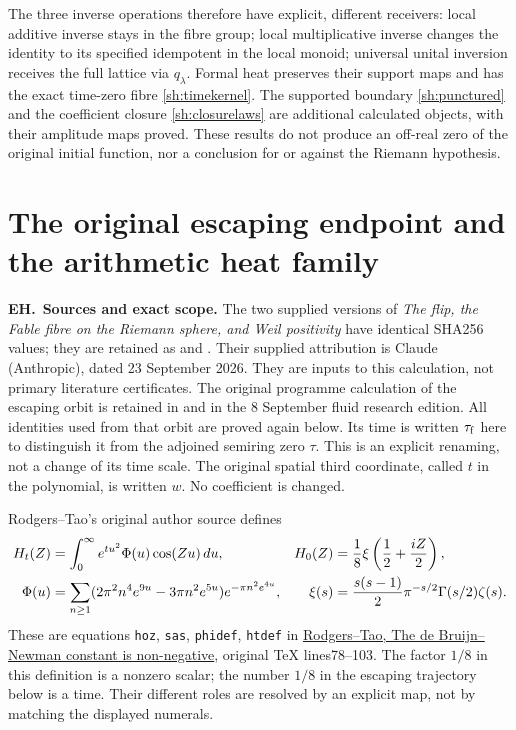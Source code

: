 \documentclass[11pt,a4paper]{article}
\theoremstyle{definition}\newtheorem{definition}[theorem]{Definition}
\begin{document}
The three inverse operations therefore have explicit, different
receivers: local additive inverse stays in the fibre group;
local multiplicative inverse changes the identity to its
specified idempotent in the local monoid; universal unital
inversion receives the full lattice via $q_\lambda$.
Formal heat preserves their support maps and has the exact
time-zero fibre \eqref{sh:timekernel}. The supported boundary
\eqref{sh:punctured} and the coefficient closure
\eqref{sh:closurelaws} are additional calculated objects, with
their amplitude maps proved. These results do not produce an
off-real zero of the original initial function, nor a conclusion
for or against the Riemann hypothesis.


\endgroup

\section{The original escaping endpoint and the arithmetic heat family}
\label{sec:eh}
\renewcommand{\theeh}{EH\arabic{eh}}
\newcommand{\EH}{\par\medskip\noindent\textbf{\theeh.}\ }

\EH\textbf{Sources and exact scope.}
The two supplied versions of \emph{The flip, the Fable fibre on the Riemann
sphere, and Weil positivity} have identical SHA256 values; they are retained
as  and . Their supplied
attribution is Claude (Anthropic), dated 23 September 2026. They are inputs
to this calculation, not primary literature certificates. The original
programme calculation of the escaping orbit is retained in
 and
 in the 8 September fluid research edition.
All identities used from that orbit are proved again below. Its time is
written $\tau_{\rm f}$ here to distinguish it from the adjoined semiring
zero $\tau$. This is an explicit renaming, not a change of its time scale.
The original spatial third coordinate, called $t$ in the polynomial, is
written $w$. No coefficient is changed.

Rodgers--Tao's original author source defines
\begin{align}
 H_t(Z)&=\int_0^\infty e^{tu^2}\Phi(u)\cos(Zu)\,du,
 &H_0(Z)&=\frac18\xi\left(\frac12+\frac{iZ}{2}\right),\label{eq:eh-heat}\\
 \Phi(u)&=\sum_{n\ge1}(2\pi^2n^4e^{9u}-3\pi n^2e^{5u})
 e^{-\pi n^2e^{4u}},
 &\xi(s)&=\frac{s(s-1)}2\pi^{-s/2}\Gamma(s/2)\zeta(s).\notag
\end{align}
These are equations \texttt{hoz}, \texttt{sas}, \texttt{phidef},
\texttt{htdef} in \href{https://arxiv.org/abs/1801.05914v5}{Rodgers--Tao,
The de Bruijn--Newman constant is non-negative}, original TeX lines78--103.
The factor $1/8$ in this definition is a nonzero scalar; the number $1/8$
in the escaping trajectory below is a time. Their different roles are
resolved by an explicit map, not by matching the displayed numerals.
\end{document}
